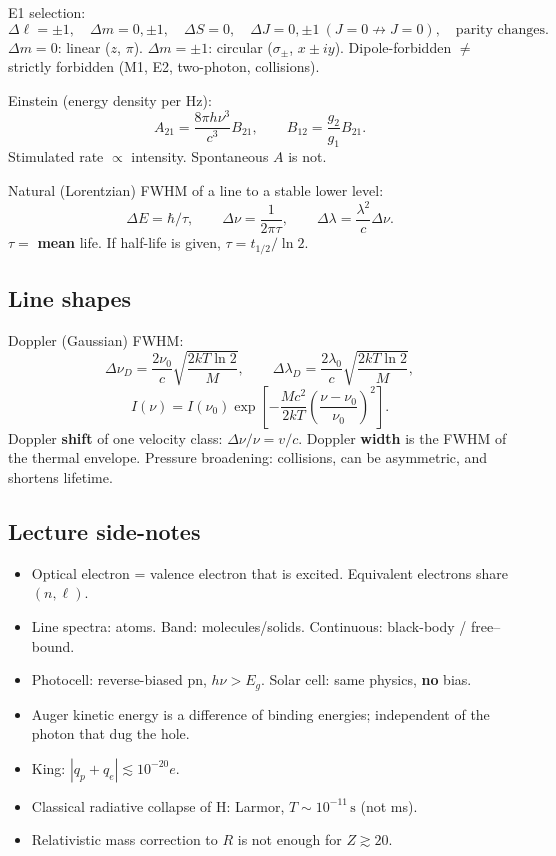 \documentclass[11pt,a4paper]{article}
\begin{document}
E1 selection:
\[
\Delta \ell=\pm 1,\quad \Delta m=0,\pm 1,\quad \Delta S=0,\quad
\Delta J=0,\pm 1\ (J=0\not\to J=0),\quad \text{parity changes.}
\]
\(\Delta m=0\): linear (\(z\), \(\pi\)). \(\Delta m=\pm 1\): circular (\(\sigma_\pm\), \(x\pm iy\)).
Dipole-forbidden \(\neq\) strictly forbidden (M1, E2, two-photon, collisions).

Einstein (energy density per Hz):
\[
A_{21}=\frac{8\pi h\nu^3}{c^3}B_{21},\qquad B_{12}=\frac{g_2}{g_1}B_{21}.
\]
Stimulated rate \(\propto\) intensity. Spontaneous \(A\) is not.

Natural (Lorentzian) FWHM of a line to a stable lower level:
\[
\Delta E=\hbar/\tau,\qquad \Delta\nu=\frac{1}{2\pi\tau},\qquad
\Delta\lambda=\frac{\lambda^2}{c}\Delta\nu.
\]
\(\tau=\) \textbf{mean} life. If half-life is given, \(\tau=t_{1/2}/\ln 2\).

\subsection{Line shapes}
Doppler (Gaussian) FWHM:
\[
\Delta\nu_D=\frac{2\nu_0}{c}\sqrt{\frac{2kT\ln 2}{M}},\qquad
\Delta\lambda_D=\frac{2\lambda_0}{c}\sqrt{\frac{2kT\ln 2}{M}},
\]
\[
I(\nu)=I(\nu_0)\exp\left[-\frac{Mc^2}{2kT}\left(\frac{\nu-\nu_0}{\nu_0}\right)^2\right].
\]
Doppler \textbf{shift} of one velocity class: \(\Delta\nu/\nu=v/c\). Doppler \textbf{width} is the FWHM of the thermal envelope.
Pressure broadening: collisions, can be asymmetric, and shortens lifetime.

\subsection*{Lecture side-notes}
\begin{itemize}
\item Optical electron = valence electron that is excited. Equivalent electrons share \((n,\ell)\).
\item Line spectra: atoms. Band: molecules/solids. Continuous: black-body / free--bound.
\item Photocell: reverse-biased pn, \(h\nu>E_g\). Solar cell: same physics, \textbf{no} bias.
\item Auger kinetic energy is a difference of binding energies; independent of the photon that dug the hole.
\item King: \(|q_p+q_e|\lesssim 10^{-20}e\).
\item Classical radiative collapse of H: Larmor, \(T\sim 10^{-11}\,\mathrm{s}\) (not ms).
\item Relativistic mass correction to \(R\) is not enough for \(Z\gtrsim 20\).
\end{itemize}
\end{document}
